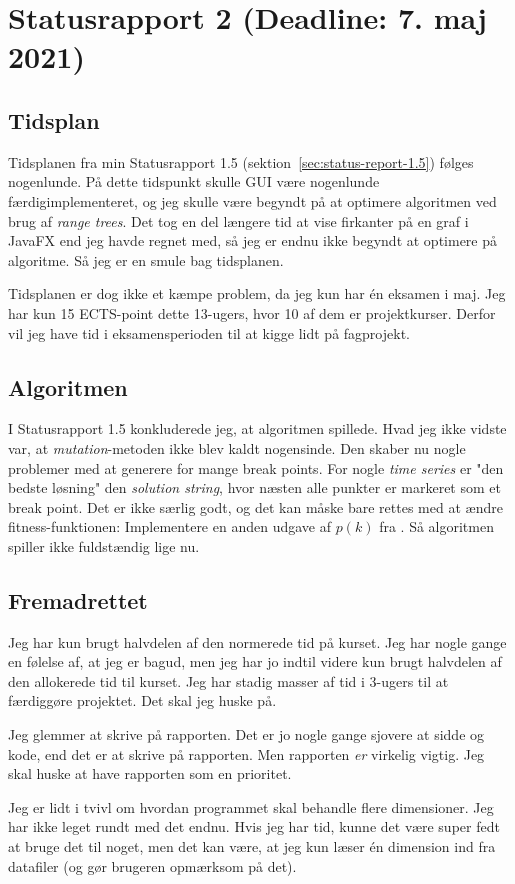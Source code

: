 
\section{Statusrapport 2 (Deadline: 7. maj 2021)} \label{sec:status-rapport-2}

\subsection{Tidsplan}

Tidsplanen fra min Statusrapport 1.5 (sektion~\ref{sec:status-report-1.5})
følges nogenlunde. På dette tidspunkt skulle GUI være nogenlunde
færdigimplementeret, og jeg skulle være begyndt på at optimere algoritmen ved
brug af \textit{range trees}. Det tog en del længere tid at vise firkanter på en
graf i JavaFX end jeg havde regnet med, så jeg er endnu ikke begyndt at optimere
på algoritme. Så jeg er en smule bag tidsplanen. 

Tidsplanen er dog ikke et kæmpe problem, da jeg kun har én eksamen i maj. Jeg
har kun 15 ECTS-point dette 13-ugers, hvor 10 af dem er projektkurser. Derfor
vil jeg have tid i eksamensperioden til at kigge lidt på fagprojekt. 

\subsection{Algoritmen}

I Statusrapport 1.5 konkluderede jeg, at algoritmen spillede. Hvad jeg ikke
vidste var, at \textit{mutation}-metoden ikke blev kaldt nogensinde. Den skaber
nu nogle problemer med at generere for mange break points. For nogle
\textit{time series} er "den bedste løsning" den \textit{solution string}, hvor
næsten alle punkter er markeret som et break point. Det er ikke særlig godt, og
det kan måske bare rettes med at ændre fitness-funktionen: Implementere en anden
udgave af $p(k)$ fra \cite{doerr2017a}. Så algoritmen spiller ikke fuldstændig
lige nu. 

\subsection{Fremadrettet}

Jeg har kun brugt halvdelen af den normerede tid på kurset. Jeg har nogle gange
en følelse af, at jeg er bagud, men jeg har jo indtil videre kun brugt halvdelen
af den allokerede tid til kurset. Jeg har stadig masser af tid i 3-ugers til at
færdiggøre projektet. Det skal jeg huske på. 

Jeg glemmer at skrive på rapporten. Det er jo nogle gange sjovere at sidde og
kode, end det er at skrive på rapporten. Men rapporten \textit{er} virkelig
vigtig. Jeg skal huske at have rapporten som en prioritet. 

Jeg er lidt i tvivl om hvordan programmet skal behandle flere dimensioner. Jeg
har ikke leget rundt med det endnu. Hvis jeg har tid, kunne det være super fedt
at bruge det til noget, men det kan være, at jeg kun læser én dimension ind fra
datafiler (og gør brugeren opmærksom på det). 

\newpage